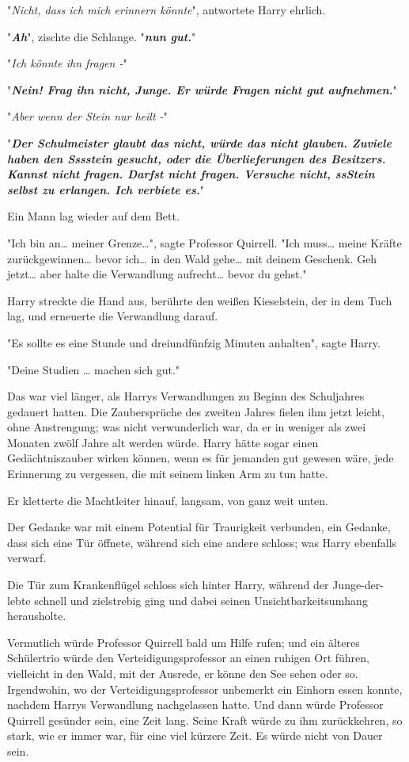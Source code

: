{"\emph{Nicht, dass ich mich erinnern könnte}", antwortete Harry ehrlich.

"\textbf{\emph{Ah}}", zischte die Schlange. "\textbf{\emph{nun gut.}}"

"\emph{Ich könnte ihn fragen -}"

"\textbf{\emph{Nein! Frag ihn nicht, Junge. Er würde Fragen nicht gut aufnehmen.}}"

"\emph{Aber wenn der Stein nur heilt -}"

"\textbf{\emph{Der Schulmeister glaubt das nicht, würde das nicht glauben. Zuviele haben den Sssstein gesucht, oder die Überlieferungen des Besitzers. Kannst nicht fragen. Darfst nicht fragen. Versuche nicht, ssStein selbst zu erlangen. Ich verbiete es.}}"

Ein Mann lag wieder auf dem Bett.

"Ich bin an… meiner Grenze…", sagte Professor Quirrell. "Ich muss… meine Kräfte zurückgewinnen… bevor ich… in den Wald gehe… mit deinem Geschenk. Geh jetzt… aber halte die Verwandlung aufrecht… bevor du gehst."

Harry streckte die Hand aus, berührte den weißen Kieselstein, der in dem Tuch lag, und erneuerte die Verwandlung darauf.

"Es sollte es eine Stunde und dreiundfünfzig Minuten anhalten", sagte Harry.

"Deine Studien … machen sich gut."

Das war viel länger, als Harrys Verwandlungen zu Beginn des Schuljahres gedauert hatten. Die Zaubersprüche des zweiten Jahres fielen ihm jetzt leicht, ohne Anstrengung; was nicht verwunderlich war, da er in weniger als zwei Monaten zwölf Jahre alt werden würde. Harry hätte sogar einen Gedächtniszauber wirken können, wenn es für jemanden gut gewesen wäre, jede Erinnerung zu vergessen, die mit seinem linken Arm zu tun hatte.

Er kletterte die Machtleiter hinauf, langsam, von ganz weit unten.

Der Gedanke war mit einem Potential für Traurigkeit verbunden, ein Gedanke, dass sich eine Tür öffnete, während sich eine andere schloss; was Harry ebenfalls verwarf.

Die Tür zum Krankenflügel schloss sich hinter Harry, während der Junge-der-lebte schnell und zielstrebig ging und dabei seinen Unsichtbarkeitsumhang herausholte.

Vermutlich würde Professor Quirrell bald um Hilfe rufen; und ein älteres Schülertrio würde den Verteidigungsprofessor an einen ruhigen Ort führen, vielleicht in den Wald, mit der Ausrede, er könne den See sehen oder so. Irgendwohin, wo der Verteidigungsprofessor unbemerkt ein Einhorn essen konnte, nachdem Harrys Verwandlung nachgelassen hatte. Und dann würde Professor Quirrell gesünder sein, eine Zeit lang. Seine Kraft würde zu ihm zurückkehren, so stark, wie er immer war, für eine viel kürzere Zeit. Es würde nicht von Dauer sein.

}
